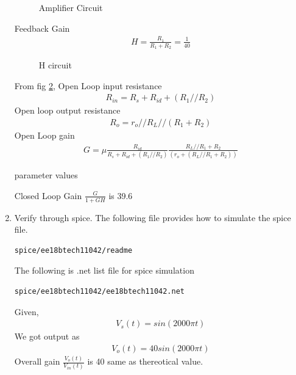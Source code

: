 \begin{enumerate}[label=\arabic*.,ref=\theenumi]
\begin{figure}[!h]
		\resizebox{\columnwidth}{!}{}
\caption{Amplifier Circuit}
\label{fig:ee18btech11042_1}
\end{figure}
Feedback Gain
\begin{align}
    H = \frac{R_1}{R_1+R_2} = \frac{1}{40}
    \label{eq:ee18btech11042_6}
\end{align}
\begin{figure}[!h]
		\resizebox{\columnwidth}{!}{}
\caption{H circuit}
\label{fig:ee18btech11042_2}
\end{figure}
From fig \ref{fig:ee18btech11042_2},
Open Loop  input resistance
\begin{align}
    R_{in} = R_s+R_{id}+(R_1//R_2)
    \label{eq:ee18btech11042_7}
\end{align}
Open loop output resistance 
\begin{align}
    R_o = r_o//R_L//(R_1+R_2)
    \label{eq:ee18btech11042_8}
\end{align}
Open Loop gain
\begin{align}
    G = \mu \frac{R_{id}}{R_s+R_{id}+(R_1//R_2)}\frac{R_L//R_1+R_2}{(r_o+(R_L//R_1+R_2))}
    \label{eq:ee18btech11042_9}
\end{align}
\begin{table}[!h]
    \centering
  	\resizebox{\columnwidth}{!}{}
    \caption{parameter values}
    \label{table:ee18btech11042_1}
\end{table}

 Closed Loop Gain   $\frac{G}{1+GH}$  is 39.6


\item Verify through spice.
\newline
The following file provides how to simulate the spice file.
\begin{lstlisting}
spice/ee18btech11042/readme
\end{lstlisting}


 The following is .net list file for spice simulation
 
\begin{lstlisting}
spice/ee18btech11042/ee18btech11042.net
\end{lstlisting}
Given,
\begin{align}
    V_s (t)= sin(2000\pi t)
    \label{eq:ee18btech11042_11}
\end{align}
We got output as
\begin{align}
    V_o(t) = 40 sin(2000\pi t)
    \label{eq:ee18btech11042_12}
\end{align}
Overall gain  $\frac{V_o(t)}{V_{in}(t)}$ is 40 same as thereotical value.
\begin{figure}[!ht]
    

\end{figure}
\end{enumerate}
